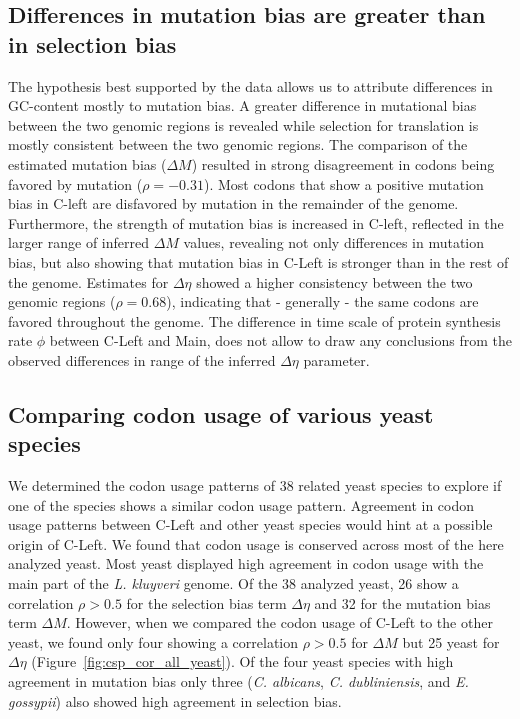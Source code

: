 \documentclass[letter,12pt]{article}
\begin{document}
\subsection*{Differences in mutation bias are greater than in selection bias}
The hypothesis best supported by the data allows us to attribute differences in GC-content mostly to mutation bias. 
A greater difference in mutational bias between the two genomic regions is revealed while selection for translation is mostly consistent between the two genomic regions. 
The comparison of the estimated mutation bias ($\Delta M$) resulted in strong disagreement in codons being favored by mutation ($\rho = -0.31$). 
Most codons that show a positive mutation bias in C-left are disfavored by mutation in the remainder of the genome.  
Furthermore, the strength of mutation bias is increased in C-left, reflected in the larger range of inferred $\Delta M$ values, revealing not only differences in mutation bias, but also showing that mutation bias in C-Left is stronger than in the rest of the genome. 
Estimates for $\Delta \eta$ showed a higher consistency between the two genomic regions ($\rho = 0.68$), indicating that - generally - the same codons are favored throughout the genome. 
The difference in time scale of protein synthesis rate $\phi$ between C-Left and Main, does not allow to draw any conclusions from the observed differences in range of the inferred $\Delta \eta$ parameter.

\subsection*{Comparing codon usage of various yeast species}
We determined the codon usage patterns of 38 related yeast species to explore if one of the species shows a similar codon usage pattern.
Agreement in codon usage patterns between C-Left and other yeast species would hint at a possible origin of C-Left.
We found that codon usage is conserved across most of the here analyzed yeast. 
Most yeast displayed high agreement in codon usage with the main part of the \textit{L. kluyveri} genome. Of the 38 analyzed yeast, 26 show a correlation $\rho > 0.5$ for the selection bias term $\Delta \eta$ and 32 for the mutation bias term $\Delta M$.
However, when we compared the codon usage of C-Left to the other yeast, we found only four showing a correlation $\rho > 0.5$ for $\Delta M$ but 25 yeast for $\Delta \eta$ (Figure~\ref{fig:csp_cor_all_yeast}).
Of the four yeast species with high agreement in mutation bias only three (\textit{C. albicans}, \textit{C. dubliniensis}, and \textit{E. gossypii}) also showed high agreement in selection bias.
\end{document}
